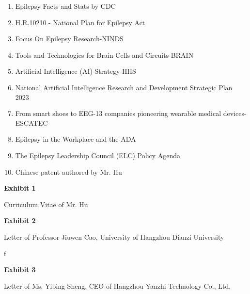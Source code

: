 \documentclass{article}
\begin{document}
\begin{enumerate}[label={Exhibit \arabic*:}]
    \item Epilepsy Facts and Stats by CDC
    \item H.R.10210 - National Plan for Epilepsy Act
    \item Focus On Epilepsy Research-NINDS
    \item Tools and Technologies for Brain Cells and Circuits-BRAIN
    \item Artificial Intelligence (AI) Strategy-HHS
    \item National Artificial Intelligence Research and Development Strategic Plan 2023
    \item From smart shoes to EEG-13 companies pioneering wearable medical devices-ESCATEC
    \item Epilepsy in the Workplace and the ADA
    \item The Epilepsy Leadership Council (ELC) Policy Agenda
    \item Chinese patent authored by Mr. Hu
\end{enumerate}

\clearpage

\vspace*{\fill}
\begin{center}

{\LARGE \bf
Exhibit 1
}

\vspace{10\baselineskip}

{\large Curriculum Vitae of Mr. Hu}

\end{center}
\vspace*{\fill}

% 

\vspace*{\fill}
\begin{center}

{\LARGE \bf
Exhibit 2
}

\vspace{10\baselineskip}

{\large Letter of Professor Jiuwen Cao, University of Hangzhou Dianzi University}

\end{center}
\vspace*{\fill}
f
% 

\vspace*{\fill}
\begin{center}

{\LARGE \bf
Exhibit 3
}

\vspace{10\baselineskip}

{\large Letter of Ms. Yibing Sheng, CEO of Hangzhou Yanzhi Technology Co., Ltd.}

\end{center}
\vspace*{\fill}
\end{document}
